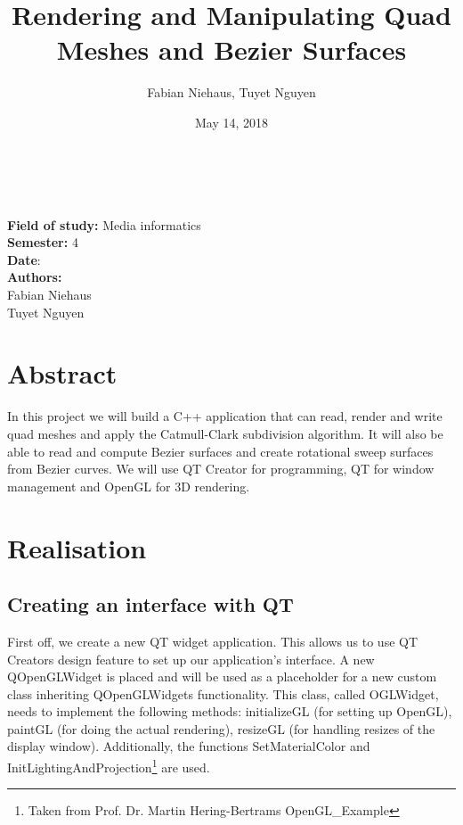 \documentclass[12pt,a4paper]{scrartcl}
\title{Rendering and Manipulating Quad Meshes and Bezier Surfaces}
\author{Fabian Niehaus, Tuyet Nguyen}
\date{May 14, 2018}
\begin{document}
\begin{titlepage}
	\centering
	\ \\[2cm]
	{\huge\textbf{\@title}} 
	\\[3cm]
	\large
	\textbf{Field of study:} Media informatics \\
	\textbf{Semester:} 4
	\\[2cm]
	\textbf{Date}: \@date
	\\[2cm]
	\textbf {Authors:}
	\\Fabian Niehaus
	\\Tuyet Nguyen
\end{titlepage}

\newpage
\setcounter{page}{0}
\tableofcontents
\newpage
\listoffigures

\newpage
\ofoot[]{\pagemark}
\normalsize

\section{Abstract}
In this project we will build a C++ application that can read, render and write quad meshes and apply the Catmull-Clark subdivision algorithm. It will also be able to read and compute Bezier surfaces and create rotational sweep surfaces from Bezier curves. We will use QT Creator for programming, QT for window management and OpenGL for 3D rendering.

\section{Realisation}

\subsection{Creating an interface with QT}
First off, we create a new QT widget application. This allows us to use QT Creators design feature to set up our application's interface. A new QOpenGLWidget is placed and will be used as a placeholder for a new custom class inheriting QOpenGLWidgets functionality. This class, called OGLWidget, needs to implement the following methods: initializeGL (for setting up OpenGL), paintGL (for doing the actual rendering), resizeGL (for handling resizes of the display window). Additionally, the functions SetMaterialColor and InitLightingAndProjection\footnote{Taken from Prof. Dr. Martin Hering-Bertrams OpenGL_Example} are used.
\end{document}
